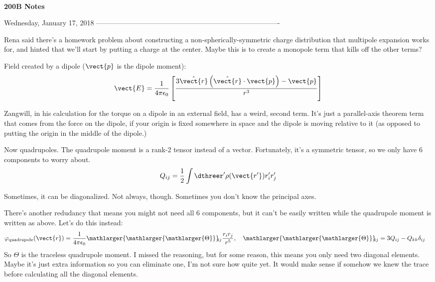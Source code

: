 \documentclass[letterpaper]{article}
\newcommand{\Title}{200B Notes}
\newcommand{\insertTitle}{{\noindent\Huge\bf  \\[0.5\baselineskip] {\selectfont \Title{}}}}
\begin{document}
\insertTitle

Wednesday, January 17, 2018
-------------------------------------------------------------------------------

Rena said there's a homework problem about constructing a non-spherically-symmetric charge distribution that multipole expansion works for, and hinted that we'll start by putting a charge at the center. Maybe this is to create a monopole term that kills off the other terms?

Field created by a dipole ($\vect{p}$ is the dipole moment):
\begin{equation*}
\begin{aligned}
	\vect{E} = \frac{1}{4\pi\epsilon_0}\left[\frac{3\hat{\vect{r}}\left(\hat{\vect{r}}\cdot \vect{p}\right)-\vect{p}}{r^3}\right]
\end{aligned}
\end{equation*}

Zangwill, in his calculation for the torque on a dipole in an external field, has a weird, second term. It's just a parallel-axis theorem term that comes from the force on the dipole, if your origin is fixed somewhere in space and the dipole is moving relative to it (as opposed to putting the origin in the middle of the dipole.)

Now quadrupoles. The quadrupole moment is a rank-2 tensor instead of a vector. Fortunately, it's a symmetric tensor, so we only have 6 components to worry about.
\begin{equation*}
\begin{aligned}
	Q_{ij} = \frac{1}{2}\int\dthreer '\rho(\vect{r'})r_i'r_j'
\end{aligned}
\end{equation*}
	
Sometimes, it can be diagonalized. Not always, though. Sometimes you don't know the principal axes.

There's another redudancy that means you might not need all 6 components, but it can't be easily written while the quadrupole moment is written as above. Let's do this instead:
\begin{equation*}
\begin{aligned}
	\varphi_\text{quadrupole}(\vect{r}) &= \frac{1}{4\pi\epsilon_0}\mathlarger{\mathlarger{\mathlarger{\Theta}}}\!\!\!\phantom{.}_{ij}\frac{r_ir_j}{r^5},\quad \mathlarger{\mathlarger{\mathlarger{\Theta}}}\!\!\!\phantom{.}_{ij} = 3Q_{ij}-Q_{kk}\delta_{ij}
\end{aligned}
\end{equation*}
So $\Theta$ is the traceless quadrupole moment. I missed the reasoning, but for some reason, this means you only need two diagonal elements. Maybe it's just extra information so you can eliminate one, I'm not sure how quite yet. It would make sense if somehow we knew the trace before calculating all the diagonal elements.
\end{document}
